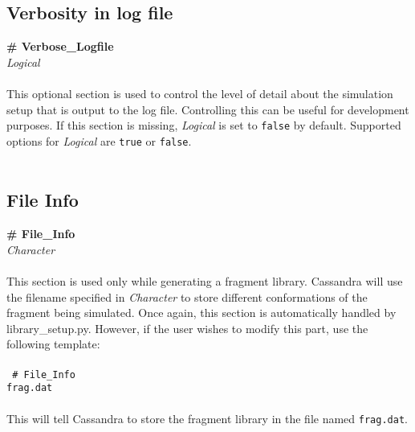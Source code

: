%
%

\subsection{Verbosity in log file}\label{sec:Verbose_Logfile}
{\bf \# Verbose\_Logfile} \\
{\it Logical} \\ \\
%
This optional section is used to control the level of detail about the simulation
setup that is output to the log file. 
Controlling this can be useful for development purposes. 
If this section is missing, {\it Logical} is set to {\tt false} by default. 
Supported options for {\it Logical} are {\tt true} or {\tt false}. \\ \\
%
%
%
\subsection{File Info}\label{sec:File_Info}
{\bf \# File\_Info } \\
{\it Character} \\ \\
%
This section is used only while generating a fragment library. Cassandra will use the filename
specified in {\it Character} to store different conformations of the fragment being simulated. Once again, this
section is automatically handled by library\_setup.py. However, if the user wishes to modify this part, 
use the following template: \\ \\
%
\texttt{
\# File\_Info \\ 
frag.dat \\ \\}
%
This will tell Cassandra to store the fragment library in the file named \texttt{frag.dat}.
%
%
%
